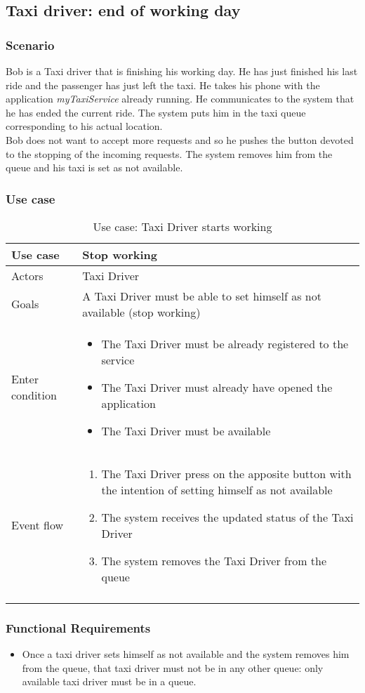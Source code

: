 \subsection{Taxi driver: end of working day}
\subsubsection{Scenario}
Bob is a Taxi driver that is finishing his working day. He has just finished his last ride and the passenger has just left the taxi. He takes his phone with the application \textit{myTaxiService} already running. He communicates to the system that he has ended the current ride. The system puts him in the taxi queue corresponding to his actual location.\\
Bob does not want to accept more requests and so he pushes the button devoted to the stopping of the incoming requests. The system removes him from the queue and his taxi is set as not available.

\subsubsection{Use case}
\begin{center}
\begin{longtable}{| p{} | p{} |} \hline
	Use case & \textbf{Stop working} \\ \hline 
	Actors & Taxi Driver \\ \hline
	Goals & A Taxi Driver must be able to set himself as not available (stop working)  \\ \hline
	Enter condition & \begin{itemize}
						\item The Taxi Driver must be already registered to the service
						\item The Taxi Driver must already have opened the application
						\item The Taxi Driver must be available
						\end{itemize} \\ \hline
	Event flow & \begin{enumerate}
					\item The Taxi Driver press on the apposite button with the intention of setting himself as not available
					\item The system receives the updated status of the Taxi Driver
					\item The system removes the Taxi Driver from the queue
				\end{enumerate} \\ \hline
	\caption{Use case: Taxi Driver starts working}
\end{longtable}
\end{center}

\subsubsection{Functional Requirements}
\begin{itemize}
\item Once a taxi driver sets himself as not available and the system removes him from the queue, that taxi driver must not be in any other queue: only available taxi driver must be in a queue.

\end{itemize}